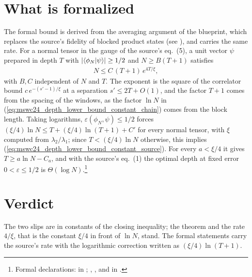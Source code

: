 \documentclass{article}
\begin{document}
\section{What is formalized}
The formal bound is derived from the averaging argument of the blueprint,
which replaces the source's fidelity of blocked product states (see
), and carries the same rate. For a
normal tensor in the gauge of the source's eq.~(5), a unit vector $\psi$
prepared in depth $T$ with $\lvert\langle \phi_N | \psi \rangle\rvert\ge1/2$ and
$N\ge B(T+1)$ satisfies
\begin{align}
    N\le C\,(T+1)\,e^{4T/\xi},
    \label{eq:mswc24_depth_lower_bound_constant_formal}
\end{align}
with $B,C$ independent of $N$ and $T$. The exponent is the square of the
correlator bound $c\,e^{-(s'-1)/\xi}$ at a separation $s'\le2T+O(1)$, and the
factor $T+1$ comes from the spacing of the windows, as the factor $\ln N$ in
(\ref{eq:mswc24_depth_lower_bound_constant_chain}) comes from the block
length. Taking logarithms, $\varepsilon(\phi_N,\psi)\le1/2$ forces
$(\xi/4)\ln N\le T+(\xi/4)\ln(T+1)+C'$ for every normal tensor, with $\xi$
computed from $\lambda_2/\lambda_1$; since $T<(\xi/4)\ln N$ otherwise, this
implies (\ref{eq:mswc24_depth_lower_bound_constant_source}). For every
$a<\xi/4$ it gives $T\ge a\ln N-C_a$, and with the source's eq.~(1) the
optimal depth at fixed error $0<\varepsilon\le1/2$ is
$\Theta(\log N)$.\footnote{Formal declarations:
     in
    ;
    ,
    ,
    and  in
    .}

\section{Verdict}
The two slips are in constants of the closing inequality; the theorem and
the rate $4/\xi$, that is the constant $\xi/4$ in front of $\ln N$, stand.
The formal statements carry the source's rate with the logarithmic
correction written as $(\xi/4)\ln(T+1)$.



\end{document}
